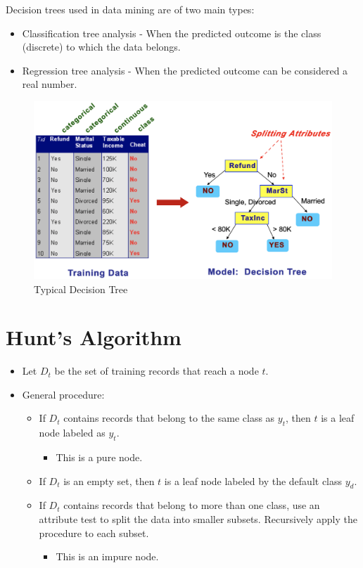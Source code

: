 \medskip
Decision trees used in data mining are of two main types:

\begin{itemize}
    \item Classification tree analysis - When the predicted outcome is the class (discrete) to which the data belongs.
    \item Regression tree analysis - When the predicted outcome can be considered a real number.
\end{itemize}

\bigskip
\begin{figure}[H]
    \centering
    \includegraphics[scale=0.35]{figures/decisiontree.png}
    \caption{Typical Decision Tree}
\end{figure}

\newpage
\section{Hunt's Algorithm}

\begin{itemize}
    \item Let $D_t$ be the set of training records that reach a node $t$.
    \item General procedure:
    \begin{itemize}
        \item If $D_t$ contains records that belong to the same class as $y_t$, then $t$ is a leaf node labeled as $y_t$.
        \begin{itemize}
            \item This is a pure node.
        \end{itemize}
        \item If $D_t$ is an empty set, then $t$ is a leaf node labeled by the default class $y_d$.
        \item If $D_t$ contains records that belong to more than one class, use an attribute test to split the data into smaller subsets. Recursively apply the procedure to each subset.
        \begin{itemize}
            \item This is an impure node.
        \end{itemize}
    \end{itemize}
\end{itemize}

